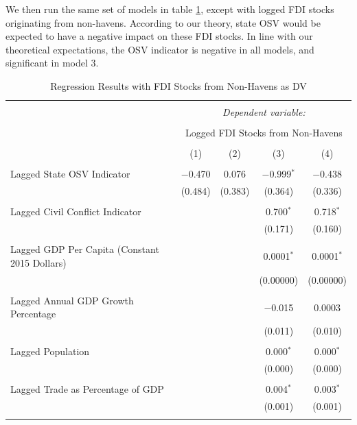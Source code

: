 \documentclass[11pt, titlepage]{article} %
\begin{document}
We then run the same set of models in table \ref{nonhavenstockDV}, except with logged FDI stocks originating from non-havens. According to our theory, state OSV would be expected to have a negative impact on these FDI stocks. In line with our theoretical expectations, the OSV indicator is negative in all models, and significant in model 3. 

\begin{table}[!htbp] \centering 
  \caption{Regression Results with FDI Stocks from Non-Havens as DV} 
  \label{nonhavenstockDV} 
\small 
\begin{tabular}{@{\extracolsep{5pt}}lcccc} 
\\[-1.8ex]\hline 
\hline \\[-1.8ex] 
 & \multicolumn{4}{c}{\textit{Dependent variable:}} \\ 
\cline{2-5} 
\\[-1.8ex] & \multicolumn{4}{c}{Logged FDI Stocks from Non-Havens} \\ 
\\[-1.8ex] & (1) & (2) & (3) & (4)\\ 
\hline \\[-1.8ex] 
 Lagged State OSV Indicator & $-$0.470 & 0.076 & $-$0.999$^{*}$ & $-$0.438 \\ 
  & (0.484) & (0.383) & (0.364) & (0.336) \\ 
  & & & & \\ 
 Lagged Civil Conflict Indicator &  &  & 0.700$^{*}$ & 0.718$^{*}$ \\ 
  &  &  & (0.171) & (0.160) \\ 
  & & & & \\ 
 Lagged GDP Per Capita (Constant 2015 Dollars) &  &  & 0.0001$^{*}$ & 0.0001$^{*}$ \\ 
  &  &  & (0.00000) & (0.00000) \\ 
  & & & & \\ 
 Lagged Annual GDP Growth Percentage &  &  & $-$0.015 & 0.0003 \\ 
  &  &  & (0.011) & (0.010) \\ 
  & & & & \\ 
 Lagged Population &  &  & 0.000$^{*}$ & 0.000$^{*}$ \\ 
  &  &  & (0.000) & (0.000) \\ 
  & & & & \\ 
 Lagged Trade as Percentage of GDP &  &  & 0.004$^{*}$ & 0.003$^{*}$ \\ 
  &  &  & (0.001) & (0.001) \\ 
  & & & & \\ 

\end{tabular}
\end{table}
\end{document}
